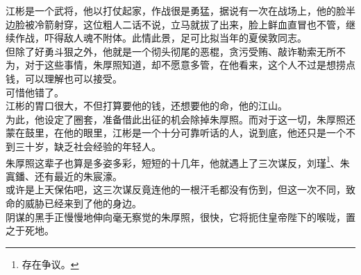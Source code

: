 \begin{multicols}{\theparacolNo}
江彬是一个武将，他以打仗起家，作战很是勇猛，据说有一次在战场上，他的脸半边脸被冷箭射穿，这位粗人二话不说，立马就拔了出来，脸上鲜血直冒也不管，继续作战，吓得敌人魂不附体。此情此景，足可比拟当年的夏侯敦同志。\\

但除了好勇斗狠之外，他就是一个彻头彻尾的恶棍，贪污受贿、敲诈勒索无所不为，对于这些事情，朱厚照知道，却不愿意多管，在他看来，这个人不过是想捞点钱，可以理解也可以接受。\\

可惜他错了。\\

江彬的胃口很大，不但打算要他的钱，还想要他的命，他的江山。\\

为此，他设定了圈套，准备借此出征的机会除掉朱厚照。而对于这一切，朱厚照还蒙在鼓里，在他的眼里，江彬是一个十分可靠听话的人，说到底，他还只是一个不到三十岁，缺乏社会经验的年轻人。\\

朱厚照这辈子也算是多姿多彩，短短的十几年，他就遇上了三次谋反，刘瑾\footnote{存在争议。}、朱寘鐇、还有最近的朱宸濠。\\

或许是上天保佑吧，这三次谋反竟连他的一根汗毛都没有伤到，但这一次不同，致命的威胁已经来到了他的身边。\\

阴谋的黑手正慢慢地伸向毫无察觉的朱厚照，很快，它将扼住皇帝陛下的喉咙，置之于死地。\\
\ifnum{}
	\end{multicols}
\fi
\newpage
